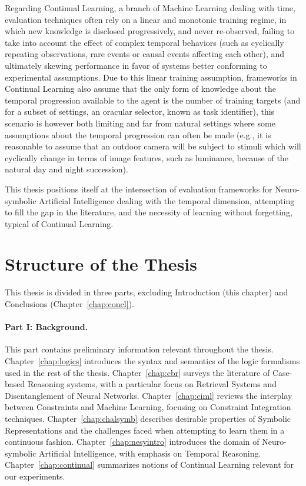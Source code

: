 Regarding Continual Learning, a branch of Machine Learning dealing with time, evaluation techniques often rely on a linear and monotonic training regime, in which new knowledge is disclosed progressively, and never re-observed, failing to take into account the effect of complex temporal behaviors (such as cyclically repeating observations, rare events or causal events affecting each other), and ultimately skewing performance in favor of systems better conforming to experimental assumptions. Due to this linear training assumption, frameworks in Continual Learning also assume that the only form of knowledge about the temporal progression available to the agent is the number of training targets (and for a subset of settings, an oracular selector, known as task identifier), this scenario is however both limiting and far from natural settings where some assumptions about the temporal progression can often be made (e.g., it is reasonable to assume that an outdoor camera will be subject to stimuli which will cyclically change in terms of image features, such as luminance, because of the natural day and night succession).

This thesis positions itself at the intersection of evaluation frameworks for Neuro-symbolic Artificial Intelligence dealing with the temporal dimension, attempting to fill the gap in the literature, and the necessity of learning without forgetting, typical of Continual Learning.

\section{Structure of the Thesis}
This thesis is divided in three parts, excluding Introduction (this chapter) and Conclusions (Chapter~\ref{chap:concl}).

\paragraph{Part I: Background.} This part contains preliminary information relevant throughout the thesis. Chapter~\ref{chap:logics} introduces the syntax and semantics of the logic formalisms used in the rest of the thesis. Chapter~\ref{chap:cbr} surveys the literature of Case-based Reasoning systems, with a particular focus on Retrieval Systems and Disentanglement of Neural Networks. Chapter~\ref{chap:ciml} reviews the interplay between Constraints and Machine Learning, focusing on Constraint Integration techniques. Chapter~\ref{chap:chalsymb} describes desirable properties of Symbolic Representations and the challenges faced when attempting to learn them in a continuous fashion. Chapter~\ref{chap:nesyintro} introduces the domain of Neuro-symbolic Artificial Intelligence, with emphasis on Temporal Reasoning. Chapter~\ref{chap:continual} summarizes notions of Continual Learning relevant for our experiments.

